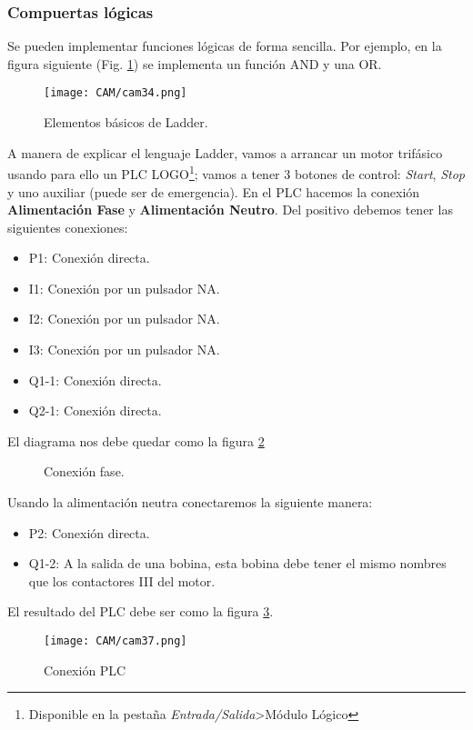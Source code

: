 \documentclass[
	12pt, %
	fleqn, %
	a4paper, %
	oneside, %
]{LegrandOrangeBook}
\begin{document}
\subsubsection{Compuertas lógicas}
Se pueden implementar funciones lógicas de forma sencilla. Por ejemplo, en la figura siguiente (Fig. \ref{fig:compuertas ladder}) se implementa un función AND y una OR.
\begin{figure}[H]
\centering
\texttt{[image: CAM/cam34.png]}
\caption{Elementos básicos de Ladder.}
\label{fig:compuertas ladder}
\end{figure}
A manera de explicar el lenguaje Ladder, vamos a arrancar un motor trifásico usando para ello un PLC LOGO\footnote{Disponible en la pestaña \textit{Entrada/Salida}>Módulo Lógico}; vamos a tener 3 botones de control: \textit{Start}, \textit{Stop} y uno auxiliar (puede ser de emergencia). En el PLC hacemos la conexión \textbf{Alimentación Fase} y \textbf{Alimentación Neutro}. Del positivo debemos tener las siguientes conexiones:
\begin{itemize}
\item P1: Conexión directa.
\item I1: Conexión por un pulsador NA.
\item I2: Conexión por un pulsador NA.
\item I3: Conexión por un pulsador NA.
\item Q1-1: Conexión directa.
\item Q2-1: Conexión directa.
\end{itemize}
El diagrama nos debe quedar como la figura \ref{fig:logo fase}\\
\begin{figure}[H]
\centering
{}
\caption{Conexión fase.}
\label{fig:logo fase}
\end{figure}
Usando la alimentación neutra conectaremos la siguiente manera:
\begin{itemize}
\item P2: Conexión directa.
\item Q1-2: A la salida de una bobina, esta bobina debe tener el mismo nombres que los contactores III del motor.
\end{itemize}
El resultado del PLC debe ser como la figura \ref{fig:conexion plc}.
\begin{figure}[H]
\centering
\texttt{[image: CAM/cam37.png]}
\caption{Conexión PLC}
\label{fig:conexion plc}
\end{figure}
\end{document}
